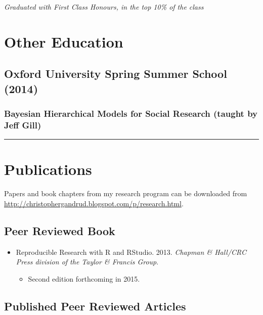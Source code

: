 \documentclass[a4paper]{article}
\begin{document}
{{{\emph{Graduated with First Class Honours, in the top 10\% of the class}}

\section*{Other Education}

\subsection*{Oxford University Spring Summer School (2014)}

\subsubsection*{Bayesian Hierarchical Models for Social Research (taught by Jeff Gill)}

\vspace{0.25cm}
\medskip\hrule height 1pt
\vspace{0.5cm}


\section*{Publications}

\noindent Papers and book chapters from my research program can be downloaded from {\url{http://christophergandrud.blogspot.com/p/research.html}}.

\subsection*{Peer Reviewed Book}

\begin{itemize}
    \item Reproducible Research with R and RStudio. 2013. {\emph{Chapman \& Hall/CRC Press division of the Taylor \& Francis Group}}.

        \begin{itemize}
            \item Second edition forthcoming in 2015.
        \end{itemize}

\end{itemize}

\subsection*{Published Peer Reviewed Articles}

}}
\end{document}
